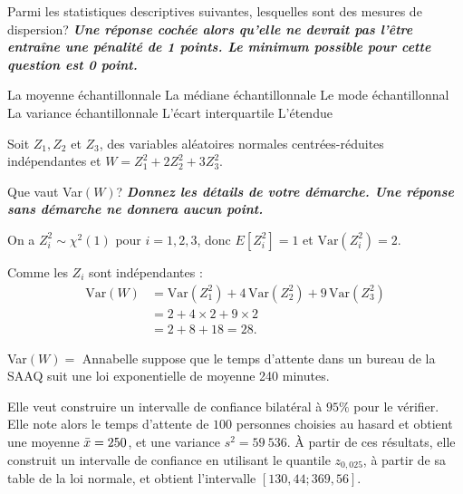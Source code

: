 \begin{questions}
\question[4]
Parmi les statistiques descriptives suivantes, lesquelles sont des mesures de dispersion? \textit{\textbf{Une réponse cochée alors qu'elle ne devrait pas l'être entraîne une pénalité de 1 points. Le minimum possible pour cette question est 0 point.}}

\begin{checkboxes}
\choice La moyenne échantillonnale
\choice La médiane échantillonnale
\choice Le mode échantillonnal
\correctchoice La variance échantillonnale
\correctchoice L'écart interquartile
\correctchoice L'étendue
\end{checkboxes}

\pageblanche
\question[4]
Soit $Z_1,Z_2$ et $Z_{3}$, des variables aléatoires normales centrées-réduites indépendantes et $\displaystyle W=Z_1^2+2Z_2^2+3Z_3^2$. 

Que vaut Var$(W)$? \textbf{\textit{Donnez les détails de votre démarche. Une réponse sans démarche ne donnera aucun point.}}

\begin{solution}
On a $Z_i^2 \sim \chi^2(1)$ pour $i=1,2,3$, donc $E[Z_i^2]=1$ et $\text{Var}(Z_i^2)=2$.

Comme les $Z_i$ sont indépendantes :
\begin{align*}
\text{Var}(W) &= \text{Var}(Z_1^2) + 4\,\text{Var}(Z_2^2) + 9\,\text{Var}(Z_3^2) \\
&= 2 + 4\times 2 + 9\times 2 \\
&= 2 + 8 + 18 = 28.
\end{align*}
\end{solution}

\vspace{9cm}
Var$(W)=$ 
\question 
Annabelle suppose que le temps d'attente dans un bureau de la SAAQ suit une loi exponentielle de moyenne 240 minutes.

Elle veut construire un intervalle de confiance bilatéral à $95\%$ pour le vérifier. 
Elle note alors le temps d'attente de $100$ personnes choisies au hasard et obtient une moyenne $\Bar{x}=250$, et une variance $s^2=59~536$. 
À partir de ces résultats, elle construit un intervalle de confiance en utilisant le quantile $z_{0,025}$, à partir de sa table de la loi normale, et obtient l'intervalle $[130,44;369,56]$. 
\end{questions}
